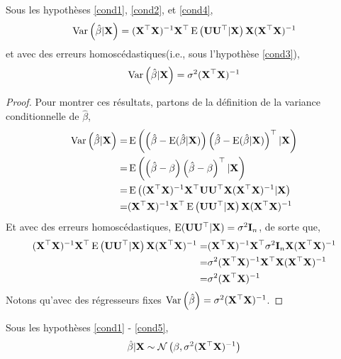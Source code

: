 \begin{propriete}
Sous les hypothèses \eqref{cond1}, \eqref{cond2}, et \eqref{cond4},
\begin{align*}
\operatorname{Var}\left(\hat{\beta} | \mathbf X \right) = (\mathbf X ^\top\mathbf X )^{-1}\mathbf X ^\top\operatorname{E}\left(\mathbf U\mathbf U^\top | \mathbf X \right)\mathbf X (\mathbf X ^\top\mathbf X )^{-1}
\end{align*}
et avec des erreurs homoscédastiques(i.e., sous l'hypothèse \eqref{cond3}),
\begin{align*}
\operatorname{Var}\left(\hat{\beta} | \mathbf X \right) = \sigma^2(\mathbf X ^\top\mathbf X )^{-1}
\end{align*}
\end{propriete}
\begin{proof}
Pour montrer ces résultats, partons de la définition de la variance conditionnelle de $\hat{\beta}$,
\begin{align*}
\operatorname{Var}\left(\hat{\beta} | \mathbf X \right) =& \operatorname{E}\left(\left(\hat{\beta} - \operatorname{E}(\hat{\beta} | \mathbf X )\right) \left(\hat{\beta} - \operatorname{E}(\hat{\beta} | \mathbf X )\right)^\top | \mathbf X \right)\\
=&\operatorname{E}\left(\left(\hat{\beta} - \beta\right) \left(\hat{\beta} - \beta\right) ^\top | \mathbf X \right)\\
=&\operatorname{E}\left((\mathbf X ^\top\mathbf X )^{-1}\mathbf X ^\top\mathbf U\mathbf U^\top\mathbf X (\mathbf X ^\top\mathbf X )^{-1}|\mathbf X \right)\\
=&(\mathbf X ^\top\mathbf X )^{-1}\mathbf X ^\top\operatorname{E}\left(\mathbf U\mathbf U^\top | \mathbf X \right)\mathbf X (\mathbf X ^\top\mathbf X )^{-1}
\end{align*}
Et avec des erreurs homoscédastiques, $\operatorname{E}(\mathbf U\mathbf U^\top| \mathbf X ) = \sigma^2\mathbf{I}_n$, de sorte que,
\begin{align*}
(\mathbf X ^\top\mathbf X )^{-1}\mathbf X ^\top\operatorname{E}\left(\mathbf U\mathbf U^\top | \mathbf X \right)\mathbf X (\mathbf X ^\top\mathbf X )^{-1} =& (\mathbf X ^\top\mathbf X )^{-1}\mathbf X ^\top \sigma^2\mathbf{I}_n \mathbf X (\mathbf X ^\top\mathbf X )^{-1}\\
=& \sigma^2(\mathbf X ^\top\mathbf X )^{-1}\mathbf X ^\top\mathbf X (\mathbf X ^\top\mathbf X )^{-1}\\
=&\sigma^2(\mathbf X ^\top\mathbf X )^{-1}
\end{align*}
Notons qu'avec des régresseurs fixes $\operatorname{Var}\left(\hat{\beta}\right) =  \sigma^2(\mathbf X ^\top\mathbf X )^{-1}$.
\end{proof}
\begin{propriete}
Sous les hypothèses \eqref{cond1} - \eqref{cond5},
\begin{align*}
\hat{\beta} | \mathbf X  \sim \mathcal{N}\left(\beta, \sigma^2(\mathbf X ^\top\mathbf X )^{-1}\right)
\end{align*}
\end{propriete}
